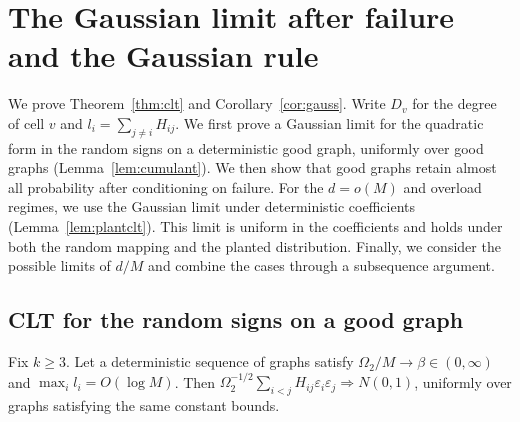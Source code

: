 \section{The Gaussian limit after failure and the Gaussian rule}\label{app:clt}
We prove Theorem~\ref{thm:clt} and Corollary~\ref{cor:gauss}. Write $D_v$ for the degree of cell $v$ and $l_i=\sum_{j\ne i}H_{ij}$. We first prove a Gaussian limit for the quadratic form in the random signs on a deterministic good graph, uniformly over good graphs (Lemma~\ref{lem:cumulant}). We then show that good graphs retain almost all probability after conditioning on failure. For the $d=o(M)$ and overload regimes, we use the Gaussian limit under deterministic coefficients (Lemma~\ref{lem:plantclt}). This limit is uniform in the coefficients and holds under both the random mapping and the planted distribution. Finally, we consider the possible limits of $d/M$ and combine the cases through a subsequence argument.

\subsection{CLT for the random signs on a good graph}
\begin{lemma}\label{lem:cumulant}
Fix $k\ge3$. Let a deterministic sequence of graphs satisfy $\Omega_2/M\to\beta\in(0,\infty)$ and $\max_il_i=O(\log M)$. Then $\Omega_2^{-1/2}\sum_{i<j}H_{ij}\varepsilon_i\varepsilon_j\Rightarrow N(0,1)$, uniformly over graphs satisfying the same constant bounds.
\end{lemma}

